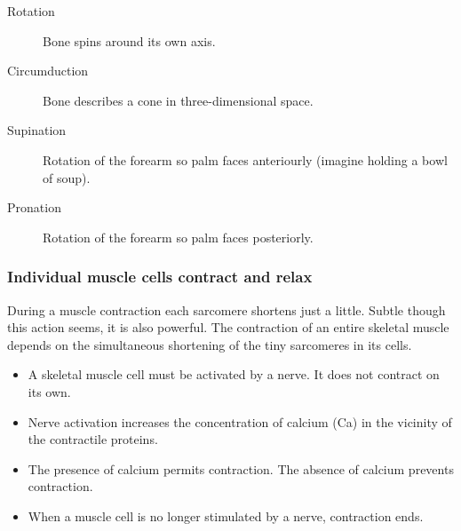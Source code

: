 \documentclass[11pt]{article}
\begin{document}
\begin{enumerate}
\begin{description}
\item[{Rotation}] Bone spins around its own axis.

\item[{Circumduction}] Bone describes a cone in three-dimensional space.

\item[{Supination}] Rotation of the forearm so palm faces anteriourly (imagine
holding a bowl of soup).

\item[{Pronation}] Rotation of the forearm so palm faces posteriorly.
\end{description}
\end{enumerate}

\subsubsection{Individual muscle cells contract and relax}
\label{sec:orgbdd690a}
During a muscle contraction each sarcomere shortens just a little. Subtle
though this action seems, it is also powerful. The contraction of an entire
skeletal muscle depends on the simultaneous shortening of the tiny
sarcomeres in its cells.

\begin{itemize}
\item A skeletal muscle cell must be activated by a nerve. It does not contract
on its own.
\item Nerve activation increases the concentration of calcium (Ca) in the
vicinity of the contractile proteins.
\item The presence of calcium permits contraction. The absence of calcium
prevents contraction.
\item When a muscle cell is no longer stimulated by a nerve, contraction ends.
\end{itemize}
\end{document}
